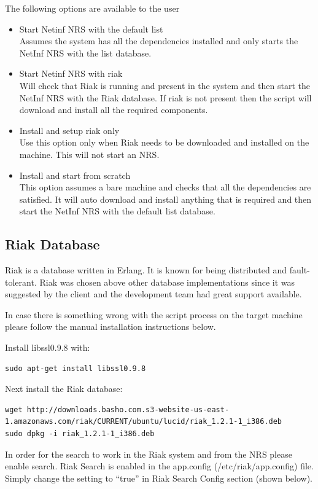 The following options are available to the user

\begin{itemize}
\item Start Netinf NRS with the default list\\
Assumes the system has all the dependencies installed and only starts the NetInf NRS with the list database.
\item Start Netinf NRS with riak\\
Will check that Riak is running and present in the system and then start the NetInf NRS with the Riak database.
If riak is not present then the script will download and install all the required components. 
\item Install and setup riak only\\
Use this option only when Riak needs to be downloaded and installed on the machine. This will not start an NRS.
\item Install and start from scratch\\
This option assumes a bare machine and checks that all the dependencies are satisfied. It will auto download and install anything that is required and then start the NetInf NRS with the default list database. 
\end{itemize}


\subsection{Riak Database}

Riak is a database written in Erlang. It is known for being distributed and fault-tolerant. Riak was chosen above other database implementations since it was suggested by the client and the development team had great support available. 

In case there is something wrong with the script process on the target machine please follow the manual installation instructions below.

Install libssl0.9.8 with:
\begin {verbatim}
sudo apt-get install libssl0.9.8
\end{verbatim}

Next install the Riak database:
\begin{verbatim}
wget http://downloads.basho.com.s3-website-us-east-1.amazonaws.com/riak/CURRENT/ubuntu/lucid/riak_1.2.1-1_i386.deb
sudo dpkg -i riak_1.2.1-1_i386.deb
\end{verbatim}

In order for the search to work in the Riak system and from the NRS please enable search.
Riak Search is enabled in the app.config (/etc/riak/app.config) file. Simply change the setting to “true” in Riak Search Config section (shown below).

